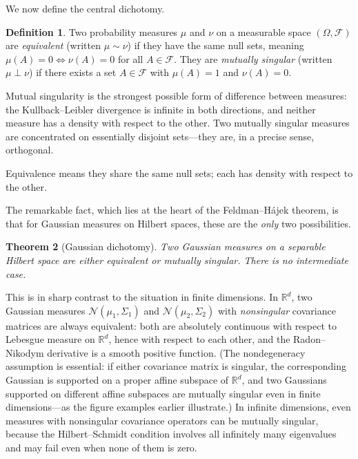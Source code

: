 \documentclass[12pt, oneside]{book}
\theoremstyle{plain}
\newtheorem{theorem}{Theorem}[chapter]
\theoremstyle{definition}
\newtheorem{definition}[theorem]{Definition}
\newcommand{\R}{\mathbb{R}}
\newcommand{\calN}{\mathcal{N}}
\begin{document}
We now define the central dichotomy.

\begin{definition}
Two probability measures $\mu$ and $\nu$ on a measurable space $(\Omega, \mathcal{F})$ are \emph{equivalent} (written $\mu \sim \nu$) if they have the same null sets, meaning $\mu(A) = 0 \iff \nu(A) = 0$ for all $A \in \mathcal{F}$. They are \emph{mutually singular} (written $\mu \perp \nu$) if there exists a set $A \in \mathcal{F}$ with $\mu(A) = 1$ and $\nu(A) = 0$.
\end{definition}

Mutual singularity is the strongest possible form of difference between measures: the Kullback--Leibler divergence is infinite in both directions, and neither measure has a density with respect to the other. Two mutually singular measures are concentrated on essentially disjoint sets---they are, in a precise sense, orthogonal.

Equivalence means they share the same null sets; each has density with respect to the other.

The remarkable fact, which lies at the heart of the Feldman--H\'ajek theorem, is that for Gaussian measures on Hilbert spaces, these are the \emph{only} two possibilities.

\begin{theorem}[Gaussian dichotomy]
\label{thm:dichotomy}
Two Gaussian measures on a separable Hilbert space are either equivalent or mutually singular. There is no intermediate case.
\end{theorem}

This is in sharp contrast to the situation in finite dimensions. In $\R^d$, two Gaussian measures $\calN(\mu_1, \Sigma_1)$ and $\calN(\mu_2, \Sigma_2)$ with \emph{nonsingular} covariance matrices are always equivalent: both are absolutely continuous with respect to Lebesgue measure on $\R^d$, hence with respect to each other, and the Radon--Nikodym derivative is a smooth positive function. (The nondegeneracy assumption is essential: if either covariance matrix is singular, the corresponding Gaussian is supported on a proper affine subspace of $\R^d$, and two Gaussians supported on different affine subspaces are mutually singular even in finite dimensions---as the figure examples earlier illustrate.) In infinite dimensions, even measures with nonsingular covariance operators can be mutually singular, because the Hilbert--Schmidt condition involves all infinitely many eigenvalues and may fail even when none of them is zero.
\end{document}
